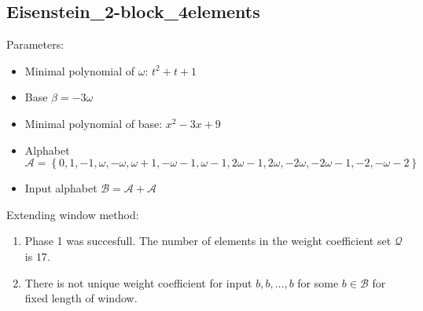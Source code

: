 \subsection{ Eisenstein\_2-block\_4elements }

\label{subsec:Eisenstein2-block4elements}

Parameters:
\begin{itemize}
    \item Minimal polynomial of $\omega$: $ t^{2} + t + 1 $
    \item Base $\beta= -3\omega $
    \item Minimal polynomial of base: $ x^{2} - 3x + 9 $
    \item Alphabet $\mathcal{A} =\left\{0, 1, -1, \omega, -\omega, \omega + 1, -\omega - 1, \omega - 1, 2\omega - 1, 2\omega, -2\omega, -2\omega - 1, -2, -\omega - 2\right\}$
    \item Input alphabet $\mathcal{B} =\mathcal{A}+ \mathcal{A}$
\end{itemize}

\noindent Extending window method:
\begin{enumerate}
    \item Phase 1 was succesfull.
The number of elements in the weight coefficient set $\mathcal{Q}$ is $17$.

    \item There is not unique weight coefficient for input $b,b,\dots,b$ for some $b\in\mathcal{B}$ for fixed length of window.

\end{enumerate}
